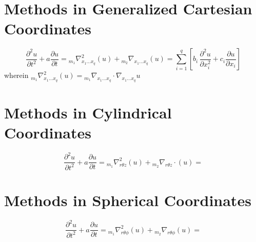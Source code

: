 \section{Methods in Generalized Cartesian Coordinates}
\begin{comment}
Massive Fault in Theoretical Understanding. IN NEED OF EXTREME REVISION
\end{comment}
$$\frac{\partial^2u}{\partial t^2} + a\frac{\partial u}{\partial t} = {}_{m_1}\nabla^2_{x_1\dots x_q}(u) + {}_{m_2}\nabla_{x_1\dots x_q}(u) = \sum^{q}_{i=1}\left[b_i\,\frac{\partial^2u}{\partial x^2_{i}} + c_i\frac{\partial u}{\partial x_{i}}\right]$$
wherein $\displaystyle{{}_{m_1}\nabla^2_{x_1\dots x_q}(u) = {}_{m_1}\nabla_{x_1\dots x_q} \cdot \nabla_{x_1\dots x_q}u}$
\section{Methods in Cylindrical Coordinates}
\begin{comment}
Massive Fault in Theoretical Understanding. IN NEED OF EXTREME REVISION
\end{comment}
$$\frac{\partial^2u}{\partial t^2} + a\frac{\partial u}{\partial t} = {}_{m_1}\nabla^2_{r\theta z}(u) + {}_{m_2}\nabla_{r\theta z}\cdot(u) = $$
\section{Methods in Spherical Coordinates}
\begin{comment}
Massive Fault in Theoretical Understanding. IN NEED OF EXTREME REVISION
\end{comment}
$$\frac{\partial^2u}{\partial t^2} + a\frac{\partial u}{\partial t} = {}_{m_1}\nabla^2_{r\theta\phi}(u) + {}_{m_2}\nabla_{r\theta\phi}(u) = $$
